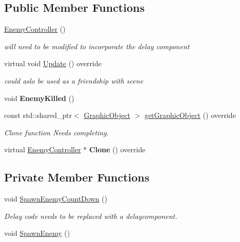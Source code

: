 \subsection*{Public Member Functions}
\begin{DoxyCompactItemize}
\item 
\mbox{\label{class_enemy_controller_a316e9275d1a1f46fef09907458e5e286}} 
\hyperlink{class_enemy_controller_a316e9275d1a1f46fef09907458e5e286}{Enemy\+Controller} ()
\begin{DoxyCompactList}\small\item\em will need to be modified to incorporate the delay component \end{DoxyCompactList}\item 
\mbox{\label{class_enemy_controller_af36ec67442d30c7519581b83ad6c00db}} 
virtual void \hyperlink{class_enemy_controller_af36ec67442d30c7519581b83ad6c00db}{Update} () override
\begin{DoxyCompactList}\small\item\em could aslo be used as a friendship with scene \end{DoxyCompactList}\item 
\mbox{\label{class_enemy_controller_a011030dd51b78317ecb16356bf6591dc}} 
void {\bfseries Enemy\+Killed} ()
\item 
\mbox{\label{class_enemy_controller_ac1166e21eb78c9d70296adc56d74caff}} 
const std\+::shared\+\_\+ptr$<$ \hyperlink{class_graphic_object}{Graphic\+Object} $>$ \hyperlink{class_enemy_controller_ac1166e21eb78c9d70296adc56d74caff}{get\+Graphic\+Object} () override
\begin{DoxyCompactList}\small\item\em Clone function Needs completing. \end{DoxyCompactList}\item 
\mbox{\label{class_enemy_controller_a3e48995e2828fb54d7df203985c0f855}} 
virtual \hyperlink{class_enemy_controller}{Enemy\+Controller} $\ast$ {\bfseries Clone} () override
\end{DoxyCompactItemize}
\subsection*{Private Member Functions}
\begin{DoxyCompactItemize}
\item 
void \hyperlink{class_enemy_controller_a84eabc12a38617b5ff05c6e896e97531}{Spawn\+Enemy\+Count\+Down} ()
\begin{DoxyCompactList}\small\item\em Delay code needs to be replaced with a delaycomponent. \end{DoxyCompactList}\item 
void \hyperlink{class_enemy_controller_ab5298e79a0bf598ed8684efb8a6a3927}{Spawn\+Enemy} ()
\end{DoxyCompactItemize}

